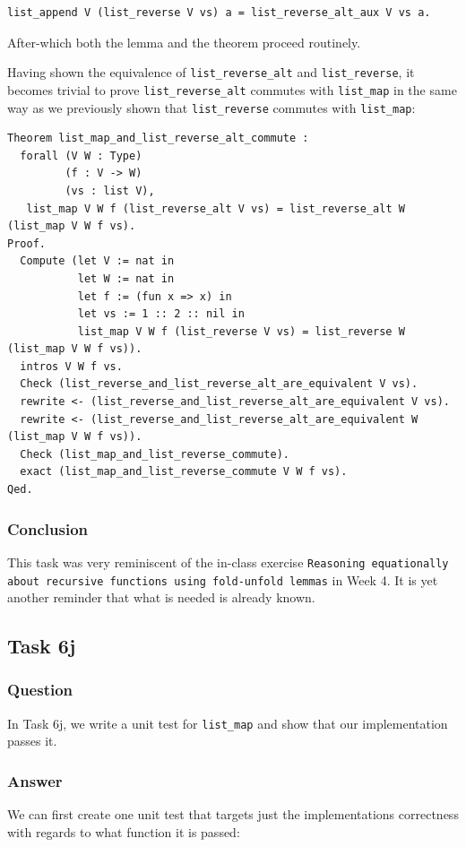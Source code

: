 \documentclass{article}
\begin{document}
\begin{lstlisting}
list_append V (list_reverse V vs) a = list_reverse_alt_aux V vs a.
\end{lstlisting}

After-which both the lemma and the theorem proceed routinely.

Having shown the equivalence of \texttt{list\_reverse\_alt} and \texttt{list\_reverse}, it becomes trivial to prove \texttt{list\_reverse\_alt} commutes with \texttt{list\_map} in the same way as we previously shown that \texttt{list\_reverse} commutes with \texttt{list\_map}:

\begin{lstlisting}
Theorem list_map_and_list_reverse_alt_commute :
  forall (V W : Type)
         (f : V -> W)
         (vs : list V),
   list_map V W f (list_reverse_alt V vs) = list_reverse_alt W (list_map V W f vs).
Proof.
  Compute (let V := nat in
           let W := nat in
           let f := (fun x => x) in
           let vs := 1 :: 2 :: nil in
           list_map V W f (list_reverse V vs) = list_reverse W (list_map V W f vs)).
  intros V W f vs.
  Check (list_reverse_and_list_reverse_alt_are_equivalent V vs).
  rewrite <- (list_reverse_and_list_reverse_alt_are_equivalent V vs).
  rewrite <- (list_reverse_and_list_reverse_alt_are_equivalent W (list_map V W f vs)).
  Check (list_map_and_list_reverse_commute).
  exact (list_map_and_list_reverse_commute V W f vs).
Qed.
\end{lstlisting}

\subsubsection{Conclusion}
This task was very reminiscent of the in-class exercise \texttt{Reasoning equationally about recursive functions using fold-unfold lemmas} in Week 4. It is yet another reminder that what is needed is already known.

\subsection{Task 6j}

\subsubsection{Question}
In Task 6j, we write a unit test for \texttt{list\_map} and show that our implementation passes it.

\subsubsection{Answer}
We can first create one unit test that targets just the implementations correctness with regards to what function it is passed:
\end{document}
